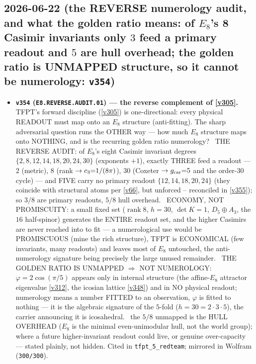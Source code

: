 \subsection*{2026-06-22 (the REVERSE numerology audit, and what the golden ratio means: of $E_8$'s 8 Casimir invariants only $3$ feed a primary readout and $5$ are hull overhead; the golden ratio is UNMAPPED structure, so it cannot be numerology: \texttt{v354})}
\begin{itemize}
\item \textbf{\texttt{v354} (\texttt{E8.REVERSE.AUDIT.01}) --- the reverse complement of \vref{v305}.} TFPT's forward
discipline (\vref{v305}) is one-directional: every physical READOUT must map onto an $E_8$ structure (anti-fitting).
The sharp adversarial question runs the OTHER way --- how much $E_8$ structure maps onto NOTHING, and is the
recurring golden ratio numerology? \mE\ THE REVERSE AUDIT: of $E_8$'s eight Casimir invariant degrees
$\{2,8,12,14,18,20,24,30\}$ (exponents $+1$), exactly THREE feed a readout --- $2$ (metric), $8$ (rank $\to c_3
{=}1/(8\pi)$), $30$ (Coxeter $\to g_{\mathrm{car}}{=}5$ and the order-$30$ cycle) --- and FIVE carry no primary readout
$\{12,14,18,20,24\}$ (they coincide with structural atoms per \vref{v66}, but unforced -- reconciled in \vref{v355});
so $3/8$ are primary readouts, $5/8$ hull overhead. \mE\ ECONOMY, NOT PROMISCUITY: a small fixed set ($\operatorname{rank}8$,
$h{=}30$, $\det K{=}1$, $D_5{\oplus}A_3$, the $16$ half-spinor) generates the ENTIRE readout set, and the higher
Casimirs are never reached into to fit --- a numerological use would be PROMISCUOUS (mine the rich structure), TFPT is
ECONOMICAL (few invariants, many readouts) and leaves most of $E_8$ untouched, the anti-numerology signature being
precisely the large unused remainder. \mE\ THE GOLDEN RATIO IS UNMAPPED $\Rightarrow$ NOT NUMEROLOGY: $\varphi=2\cos
(\pi/5)$ appears only in internal structure (the affine-$E_8$ attractor eigenvalue \vref{v312}, the icosian lattice
\vref{v348}) and in NO physical readout; numerology means a number FITTED to an observation, $\varphi$ is fitted to
nothing --- it is the algebraic signature of the $5$-fold ($h{=}30{=}2\cdot3\cdot5$), the carrier announcing it is
icosahedral. \mO\ the $5/8$ unmapped is the HULL OVERHEAD ($E_8$ is the minimal even-unimodular hull, not the world
group); where a future higher-invariant readout could live, or genuine over-capacity --- stated plainly, not hidden.
Cited in \texttt{tfpt\_5\_redteam}; mirrored in Wolfram (\texttt{300/300}).
\end{itemize}

